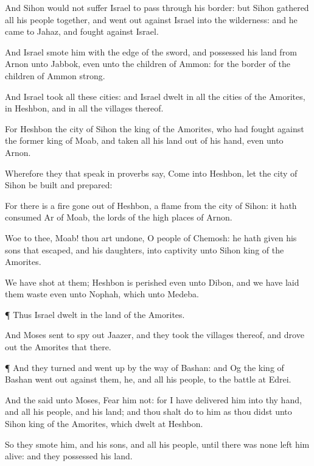 {And
Sihon would not
suffer
Israel to
pass through his
border: but
Sihon
gathered all his
people
together, and went
out
against
Israel into the
wilderness: and he
came to
Jahaz, and
fought against
Israel.

And
Israel
smote him with the
edge of the
sword, and
possessed his
land from
Arnon unto
Jabbok, even unto the
children of
Ammon: for the
border of the
children of
Ammon
{}
strong.

And
Israel
took all these
cities: and
Israel
dwelt in all the
cities of the
Amorites, in
Heshbon, and in all the
villages thereof.

For
Heshbon
{} the
city of
Sihon the
king of the
Amorites, who had
fought against the
former
king of
Moab, and
taken all his
land out of his
hand, even unto
Arnon.

Wherefore they that speak in
proverbs
say,
Come into
Heshbon, let the
city of
Sihon be
built and
prepared:

For there is a
fire gone
out of
Heshbon, a
flame from the
city of
Sihon: it hath
consumed
Ar of
Moab,
{} the lords of the high
places of
Arnon.

Woe to thee,
Moab! thou art
undone, O
people of
Chemosh: he hath
given his
sons that
escaped, and his
daughters, into
captivity unto
Sihon
king of the
Amorites.

We have
shot at them;
Heshbon is
perished even unto
Dibon, and we have laid them
waste even unto
Nophah, which
{} unto
Medeba.


\par }{\PP {}¶ Thus
Israel
dwelt in the
land of the
Amorites.

And
Moses
sent to spy
out
Jaazer, and they
took the
villages thereof, and drove
out the
Amorites that
{} there.


\par }{\PP {}¶ And they
turned and went
up by the
way of
Bashan: and
Og the
king of
Bashan went
out
against them, he, and all his
people, to the
battle at
Edrei.

And the
{}
said unto
Moses,
Fear him not: for I have
delivered him into thy
hand, and all his
people, and his
land; and thou shalt
do to him as thou
didst unto
Sihon
king of the
Amorites, which
dwelt at
Heshbon.

So they
smote him, and his
sons, and all his
people, until there was
none
left him
alive: and they
possessed his
land.




}
